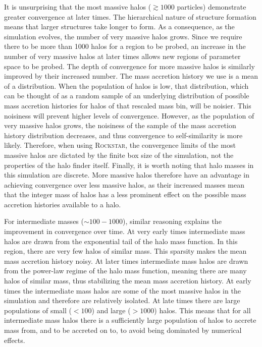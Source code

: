 It is unsurprising that the most massive halos ($\gtrsim1000$ particles) demonstrate greater convergence at later times. The hierarchical nature of structure formation means that larger structures take longer to form. As a consequence, as the simulation evolves, the number of very massive halos grows. Since we require there to be more than 1000 halos for a region to be probed, an increase in the number of very massive halos at later times allows new regions of parameter space to be probed. The depth of convergence for more massive halos is similarly improved by their increased number. The mass accretion history we use is a mean of a distribution. When the population of halos is low, that distribution, which can be thought of as a random sample of an underlying distribution of possible mass accretion histories for halos of that rescaled mass bin, will be noisier. This noisiness will prevent higher levels of convergence. However, as the population of very massive halos grows, the noisiness of the sample of the mass accretion history distribution decreases, and thus convergence to self-similarity is more likely. Therefore, when using \textsc{Rockstar}, the convergence limits of the most massive halos are dictated by the finite box size of the simulation, not the properties of the halo finder itself. Finally, it is worth noting that halo masses in this simulation are discrete. More massive halos therefore have an advantage in achieving convergence over less massive halos, as their increased masses mean that the integer mass of halos has a less prominent effect on the possible mass accretion histories available to a halo.

For intermediate masses ($\sim100-1000$), similar reasoning explains the improvement in convergence over time. At very early times intermediate mass halos are drawn from the exponential tail of the halo mass function. In this region, there are very few halos of similar mass. This sparsity makes the mean mass accretion history noisy. At later times intermediate mass halos are drawn from the power-law regime of the halo mass function, meaning there are many halos of similar mass, thus stabilizing the mean mass accretion history. At early times the intermediate mass halos are some of the most massive halos in the simulation and therefore are relatively isolated. At late times there are large populations of small ($<100$) and large ($>1000$) halos. This means that for all intermediate mass halos there is a sufficiently large population of halos to accrete mass from, and to be accreted on to, to avoid being dominated by numerical effects.

